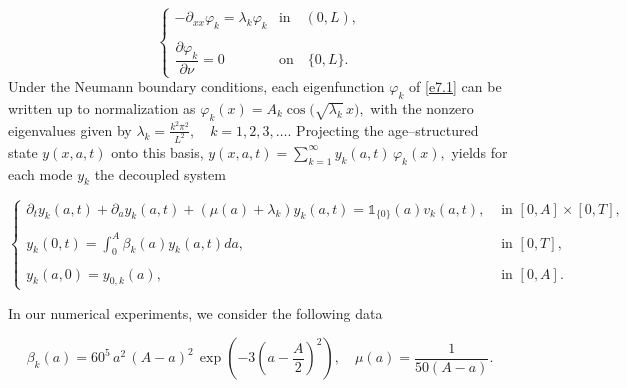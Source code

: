 \documentclass[10pt, a4]{amsart}
\theoremstyle{plain}
\theoremstyle{definition}
\theoremstyle{remark}
\numberwithin{equation}{section}
\begin{document}
\begin{equation}\label{e7.1}
\left\lbrace\begin{array}{ll}
-\partial_{xx} \varphi_k =\lambda_k\varphi_k & \text{in}\quad (0,L),\\
\\\dfrac{\partial\varphi_k}{\partial\nu} =0 & \text{on}\quad\lbrace 0,L\rbrace.
\end{array}
\right.
\end{equation} 
Under the Neumann boundary conditions, each eigenfunction $\varphi_k$ of \eqref{e7.1} can be written up to normalization as $
\varphi_k(x) = A_k \cos\bigl(\sqrt{\lambda_k}\,x\bigr),
$ with the nonzero eigenvalues given by $
\lambda_k = \frac{k^2\pi^2}{L^2}, 
\quad k=1,2,3,\dots.
$ Projecting the age–structured state $y(x,a,t)$ onto this basis, $
y(x,a,t) = \displaystyle\sum_{k=1}^\infty y_k(a,t)\,\varphi_k(x),
$ yields for each mode $y_k$ the decoupled system

\begin{equation}\label{e7.2}
\left\lbrace 
\begin{array}{ll}
\partial_t y_{k}(a,t)+\partial_a y_{k}(a,t)+(\mu(a) +\lambda_{k}) y_{k}(a,t)=\mathds{1}_{\lbrace 0\rbrace}(a)v_k(a,t), & \text{ in } [0,A]\times[0,T],\\  
\\y_k\left(0,t\right) =\displaystyle\int_0^A\beta_k(a)y_k(a,t)da, & \text{ in }  [0,T], \\  
\\y_{k}\left(a,0\right)=y_{0,k}(a), &  
\text{ in } [0,A].  
\end{array}
\right.
\end{equation}  


In our numerical experiments, we consider the following data%

$$
\beta_k(a) = 60^5\,a^2\,(A-a)^2\,\exp\left(-3\left(a - \frac{A}{2}\right)^2\right), 
\quad \mu(a) = \frac{1}{50(A-a)}.%
$$

\end{document}
